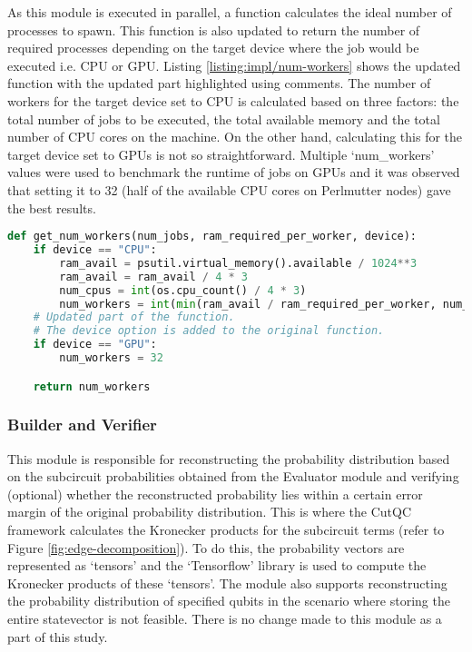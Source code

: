 As this module is executed in parallel, a function calculates the ideal number of processes to spawn. This function is also updated to return the number of required processes depending on the target device where the job would be executed i.e. CPU or GPU. Listing \ref{listing:impl/num-workers} shows the updated function with the updated part highlighted using comments. The number of workers for the target device set to CPU is calculated based on three factors: the total number of jobs to be executed, the total available memory and the total number of CPU cores on the machine. On the other hand, calculating this for the target device set to GPUs is not so straightforward. Multiple `num\_workers' values were used to benchmark the runtime of jobs on GPUs and it was observed that setting it to 32 (half of the available CPU cores on Perlmutter nodes) gave the best results.

\vspace{\baselineskip}
\begin{lstlisting}[caption={ Updated function to calculate the ideal number of processes to spawn for parallel job execution. The number of workers for CPUs is calculated whereas the number of workers for GPUs is set to 32 after benchmarking for different values. },
label={listing:impl/num-workers},
language=Python,
float]
def get_num_workers(num_jobs, ram_required_per_worker, device):
    if device == "CPU":
        ram_avail = psutil.virtual_memory().available / 1024**3
        ram_avail = ram_avail / 4 * 3
        num_cpus = int(os.cpu_count() / 4 * 3)
        num_workers = int(min(ram_avail / ram_required_per_worker, num_jobs, num_cpus))
    # Updated part of the function.
    # The device option is added to the original function.
    if device == "GPU":
        num_workers = 32

    return num_workers
\end{lstlisting}


\subsubsection{Builder and Verifier}

This module is responsible for reconstructing the probability distribution based on the subcircuit probabilities obtained from the Evaluator module and verifying (optional) whether the reconstructed probability lies within a certain error margin of the original probability distribution. This is where the CutQC framework calculates the Kronecker products for the subcircuit terms (refer to Figure \ref{fig:edge-decomposition}). To do this, the probability vectors are represented as `tensors' and the `Tensorflow' library is used to compute the Kronecker products of these `tensors'. The module also supports reconstructing the probability distribution of specified qubits in the scenario where storing the entire statevector is not feasible. There is no change made to this module as a part of this study.



